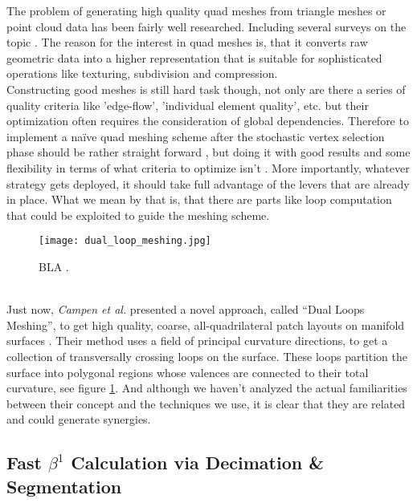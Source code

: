 The problem of generating high quality quad meshes from triangle meshes or point cloud data has been fairly well researched.
Including several surveys on the topic \citep[cf. ][]{Alliez2005, Hormann2007}.
The reason for the interest in quad meshes is, that it converts raw geometric data into a higher representation that is suitable for sophisticated operations like texturing, subdivision and compression.\\
Constructing good meshes is still hard task though, not only are there a series of quality criteria like 'edge-flow', 'individual element quality', etc. but their optimization often requires the consideration of global dependencies.
Therefore to implement a naïve quad meshing scheme after the stochastic vertex selection phase should be rather straight forward \citep[cf.][]{Li2009}, but doing it with good results and some flexibility in terms of what criteria to optimize isn't \citep[][]{Bommes2009}.
More importantly, whatever strategy gets deployed, it should take full advantage of the levers that are already in place.
What we mean by that is, that there are parts like loop computation that could be exploited to guide the meshing scheme.
\begin{figure}[ht]
\centering
\texttt{[image: dual\_loop\_meshing.jpg]}
\caption{BLA \citep[cf.][]{Campen2012}.}
\label{fig:dual_loop_meshing}
\end{figure}\\
Just now, \textit{Campen et al.} presented a novel approach, called ``Dual Loops Meshing'', to get high quality, coarse, all-quadrilateral patch layouts on manifold surfaces \citep[][]{Campen2012}.
Their method uses a field of principal curvature directions, to get a collection of transversally crossing loops on the surface.
These loops partition the surface into polygonal regions whose valences are connected to their total curvature, see figure \ref{fig:dual_loop_meshing}.
And although we haven't analyzed the actual familiarities between their concept and the techniques we use, it is clear that they are related and could generate synergies.


\subsection{Fast $\beta^{1}$ Calculation via Decimation \& Segmentation}
\label{conclusion22}

